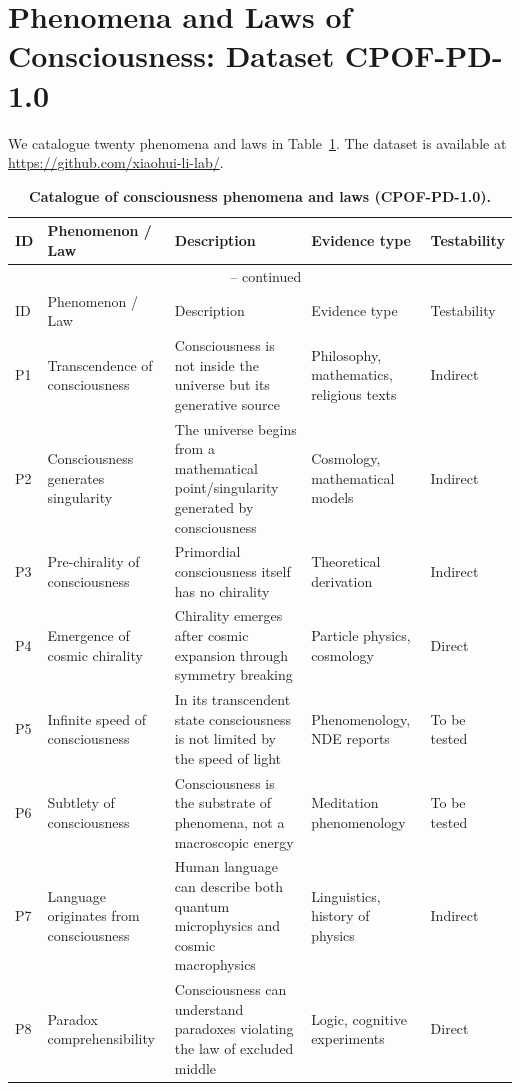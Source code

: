 \documentclass[11pt,a4paper]{article}
\begin{document}
\section{Phenomena and Laws of Consciousness: Dataset CPOF-PD-1.0}

We catalogue twenty phenomena and laws in Table~\ref{tab:phenomena}. The dataset is available at \url{https://github.com/xiaohui-li-lab/}.

\begin{longtable}{@{}p{0.7cm}p{3.0cm}p{4.8cm}p{2.8cm}p{2.0cm}@{}}
\caption{\textbf{Catalogue of consciousness phenomena and laws (CPOF-PD-1.0).}} \label{tab:phenomena}\\
\toprule
ID & Phenomenon / Law & Description & Evidence type & Testability \\
\midrule
\endfirsthead
\multicolumn{5}{c}{{\tablename\ \thetable{} -- continued}} \\
\toprule
ID & Phenomenon / Law & Description & Evidence type & Testability \\
\midrule
\endhead
\bottomrule
\endfoot
P1 & Transcendence of consciousness & Consciousness is not inside the universe but its generative source & Philosophy, mathematics, religious texts & Indirect \\
P2 & Consciousness generates singularity & The universe begins from a mathematical point/singularity generated by consciousness & Cosmology, mathematical models & Indirect \\
P3 & Pre-chirality of consciousness & Primordial consciousness itself has no chirality & Theoretical derivation & Indirect \\
P4 & Emergence of cosmic chirality & Chirality emerges after cosmic expansion through symmetry breaking & Particle physics, cosmology & Direct \\
P5 & Infinite speed of consciousness & In its transcendent state consciousness is not limited by the speed of light & Phenomenology, NDE reports & To be tested \\
P6 & Subtlety of consciousness & Consciousness is the substrate of phenomena, not a macroscopic energy & Meditation phenomenology & To be tested \\
P7 & Language originates from consciousness & Human language can describe both quantum microphysics and cosmic macrophysics & Linguistics, history of physics & Indirect \\
P8 & Paradox comprehensibility & Consciousness can understand paradoxes violating the law of excluded middle & Logic, cognitive experiments & Direct \\

\end{longtable}
\end{document}
